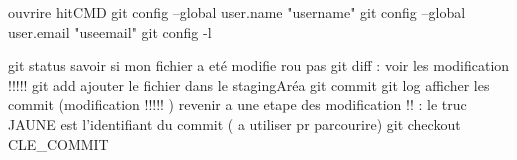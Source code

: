 ouvrire hitCMD
git config --global user.name "username"
git config --global user.email "useemail"
git config -l




git status savoir si mon fichier a eté modifie rou pas
git diff : voir les modification !!!!!
git add ajouter le fichier dans le stagingAréa
git commit 
git log afficher les commit (modification !!!!! ) 
revenir a une etape des modification !! : le truc JAUNE est l'identifiant du commit ( a utiliser pr parcourire)
git checkout CLE_COMMIT 



